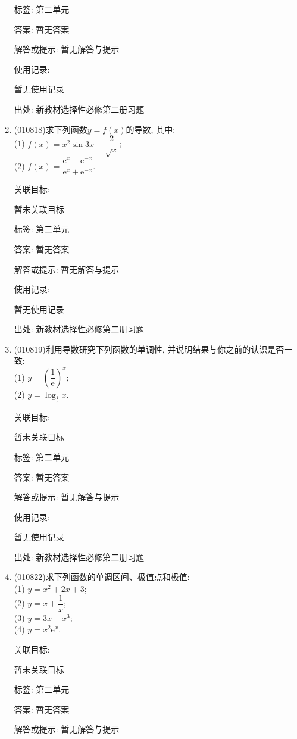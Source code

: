 \documentclass[10pt,a4paper]{article}
\begin{document}
\begin{enumerate}[1.]
标签: 第二单元

答案: 暂无答案

解答或提示: 暂无解答与提示

使用记录:

暂无使用记录


出处: 新教材选择性必修第二册习题
\item { (010818)}求下列函数$y=f(x)$的导数, 其中:\\
(1) $f(x)=x^2\sin 3x-\dfrac 2{\sqrt x}$;\\
(2) $f(x)=\dfrac{\mathrm{e}^x-\mathrm{e}^{-x}}{\mathrm{e}^x+\mathrm{e}^{-x}}$.


关联目标:

暂未关联目标



标签: 第二单元

答案: 暂无答案

解答或提示: 暂无解答与提示

使用记录:

暂无使用记录


出处: 新教材选择性必修第二册习题
\item { (010819)}利用导数研究下列函数的单调性, 并说明结果与你之前的认识是否一致:\\
(1) $y=(\dfrac 1{\mathrm{e}})^x$;\\
(2) $y=\log_{\frac 1{\mathrm{e}}}x$.


关联目标:

暂未关联目标



标签: 第二单元

答案: 暂无答案

解答或提示: 暂无解答与提示

使用记录:

暂无使用记录


出处: 新教材选择性必修第二册习题
\item { (010822)}求下列函数的单调区间、极值点和极值:\\
(1) $y=x^2+2x+3$;\\
(2) $y=x+\dfrac 1x$;\\
(3) $y=3x-x^3$;\\
(4) $y=x^2\mathrm{e}^x$.


关联目标:

暂未关联目标



标签: 第二单元

答案: 暂无答案

解答或提示: 暂无解答与提示


\end{enumerate}
\end{document}
